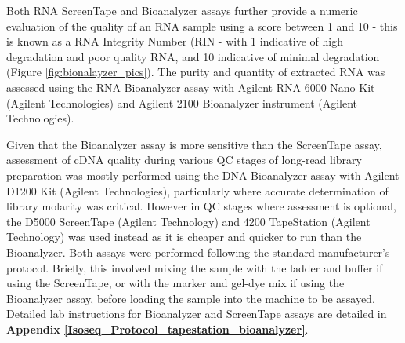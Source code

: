 Both RNA ScreenTape and Bioanalyzer assays further provide a numeric evaluation of the quality of an RNA sample using a score between 1 and 10 - this is known as a RNA Integrity Number (RIN - with 1 indicative of high degradation and poor quality RNA, and 10 indicative of minimal degradation (Figure \ref{fig:bionalayzer_pics}). The purity and quantity of extracted RNA was assessed using the RNA Bioanalyzer assay with Agilent RNA 6000 Nano Kit (Agilent Technologies) and Agilent 2100 Bioanalyzer instrument (Agilent Technologies). 

Given that the Bioanalyzer assay is more sensitive than the ScreenTape assay, assessment of cDNA quality during various QC stages of long-read library preparation was mostly performed using the DNA Bioanalyzer assay with Agilent D1200 Kit (Agilent Technologies), particularly where accurate determination of library molarity was critical. However in QC stages where assessment is optional, the D5000 ScreenTape (Agilent Technology) and 4200 TapeStation (Agilent Technology) was used instead as it is cheaper and quicker to run than the Bioanalyzer. Both assays were performed following the standard manufacturer's protocol. Briefly, this involved mixing the sample with the ladder and buffer if using the ScreenTape, or with the marker and gel-dye mix if using the Bioanalyzer assay, before loading the sample into the machine to be assayed. Detailed lab instructions for Bioanalyzer and ScreenTape assays are detailed in \textbf{Appendix \ref{Isoseq_Protocol_tapestation_bioanalyzer}}.  

